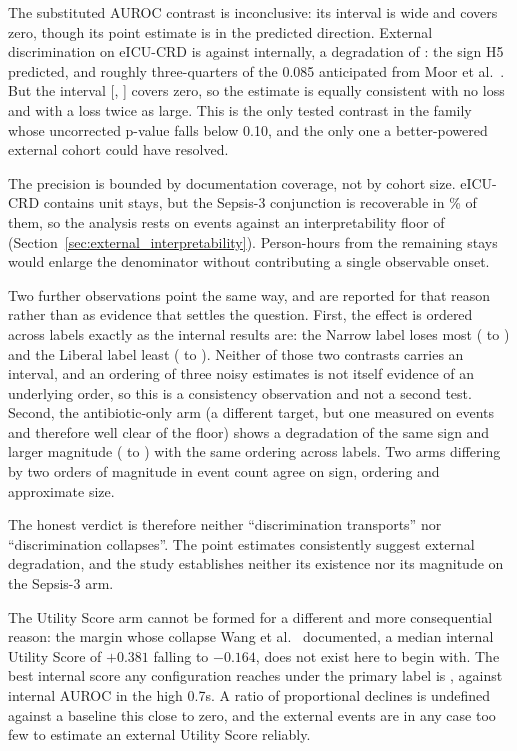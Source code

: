 The substituted AUROC contrast is inconclusive: its interval is wide and
covers zero, though its point estimate is in the predicted direction. External
discrimination on eICU-CRD is \pcExtAurocPrimaryB{} against \pcAurocPrimaryB{}
internally, a degradation of \pcHFiveEst{}: the sign H5 predicted, and
roughly three-quarters of the 0.085 anticipated from Moor et al.\
\cite{moor2023review}. But the interval [\pcHFiveCiLo, \pcHFiveCiHi] covers
zero, so the estimate is equally consistent with no loss and with a loss twice
as large. This is the only tested contrast in the family whose uncorrected
p-value falls below 0.10, and the only one a better-powered external cohort
could have resolved.

The precision is bounded by documentation coverage, not by cohort size.
eICU-CRD contains \pcExtNCohortStays{} unit stays, but the Sepsis-3 conjunction
is recoverable in \pcExtMicroCoverage\% of them, so the analysis rests on
\pcExtNEventsB{} events against an interpretability floor of \pcExtMinEvents{}
(Section~\ref{sec:external_interpretability}). Person-hours from the remaining
stays would enlarge the denominator without contributing a single observable
onset.

Two further observations point the same way, and are reported for that reason
rather than as evidence that settles the question. First,
the effect is ordered across labels exactly as the internal results are: the
Narrow label loses most (\pcAurocPrimaryA{} to \pcExtAurocPrimaryA) and the
Liberal label least (\pcAurocPrimaryC{} to \pcExtAurocPrimaryC). Neither of
those two contrasts carries an interval, and an ordering of three noisy
estimates is not itself evidence of an underlying order, so this is a
consistency observation and not a second test. Second, the antibiotic-only arm (a different target,
but one measured on \pcExtAbxNEventsB{} events and therefore well clear of the
floor) shows a degradation of the same sign and larger magnitude
(\pcAurocPrimaryB{} to \pcExtAbxAurocPrimaryB) with the same ordering across
labels. Two arms differing by two orders of magnitude in event count agree on
sign, ordering and approximate size.

The honest verdict is therefore neither ``discrimination transports'' nor
``discrimination collapses''. The point estimates consistently suggest external
degradation, and the study establishes neither its existence nor its magnitude
on the Sepsis-3 arm.

The Utility Score arm cannot be formed for a different and more consequential reason: the
margin whose collapse Wang et al.\ \cite{wang2025srpm} documented, a median internal Utility Score of $+0.381$ falling to $-0.164$, does not
exist here to begin with. The best internal score any configuration reaches
under the primary label is \pcUtilityMaxGbtB, against internal AUROC in the high
0.7s. A ratio of proportional declines is undefined against a baseline this
close to zero, and the \pcExtNEventsB{} external events are in any case too few
to estimate an external Utility Score reliably.

